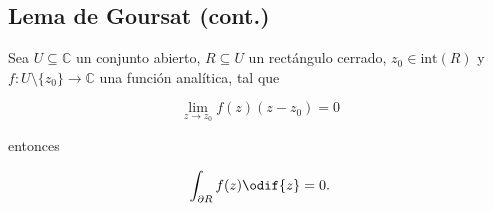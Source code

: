 \documentclass[../main.tex]{subfiles}
\begin{document}
\subsection{Lema de Goursat (cont.)}

\begin{lemma}\label{lemma:lem-goursat-v2}
    Sea \(U \subseteq \mathbb{C}\) un conjunto abierto, \(R \subseteq U\) un rectángulo
    cerrado, \(z_{0}\in \mathrm{int}(R)\) y \(f \colon U\setminus \{z_{0}\}
    \to \mathbb{C}\) una función analítica, tal que

    \begin{equation*}
        \lim_{z \to z_{0}}f(z)(z - z_{0}) = 0
    \end{equation*}

    entonces

    \begin{equation*}
        \int_{\partial R}^{}f(z)\odif{z} = 0.
    \end{equation*}
\end{lemma}
\end{document}
